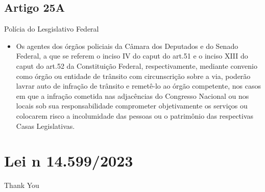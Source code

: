 \documentclass{beamer}
\begin{document}
\subsection{Artigo 25A}
\begin{frame}{Polícia do Lesgislativo Federal}
    \begin{itemize}
        \item \justifying Os agentes dos órgãos policiais da Câmara dos Deputados e do Senado Federal, a que se referem o inciso IV do caput do art.51 e o inciso XIII do caput do art.52 da Constituição Federal, respectivamente, mediante convenio como órgão ou entidade de trânsito com circunscrição sobre a via, poderão lavrar auto de infração de trânsito e remetê-lo ao órgão competente, nos casos em que a infração cometida nas adjacências do Congresso Nacional ou nos locais sob sua responsabilidade comprometer objetivamente os serviços ou colocarem risco a incolumidade das pessoas ou o patrimônio das respectivas Casas Legislativas.
    \end{itemize}
\end{frame}


\section{Lei n 14.599/2023}










\begin{frame}
    \begin{center}
        {\Huge\calligra Thank You}
    \end{center}
\end{frame}
\end{document}
